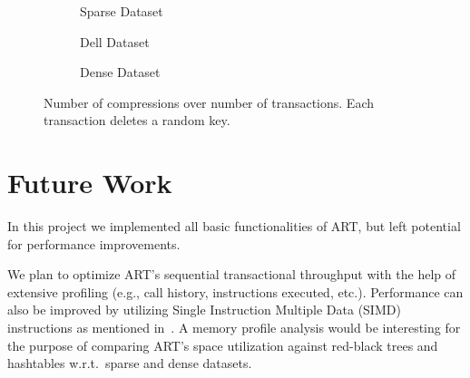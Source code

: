 \documentclass[abstracton,12pt]{scrartcl}
\theoremstyle{definition}
\begin{document}
\begin{figure}[H]
  \centering
  \begin{subfigure}[b]{0.30\textwidth}
    \caption{Sparse Dataset}
    \label{fig:compressions-sparse}
  \end{subfigure}
  \begin{subfigure}[b]{0.30\textwidth}
    \caption{Dell Dataset}
    \label{fig:compressions-paths}
  \end{subfigure}
  \begin{subfigure}[b]{0.30\textwidth}
    \caption{Dense Dataset}
    \label{fig:compressions-dense}
  \end{subfigure}
  \caption{Number of compressions over number of transactions. Each transaction
  deletes a random key.}
\end{figure}

\vspace{-5mm}
\section{Future Work}
\label{sec:future-work}

In this project we implemented all basic functionalities of ART, but left 
potential for performance improvements.

We plan to optimize ART's sequential transactional throughput with the help of
extensive profiling (e.g., call history, instructions executed, etc.).
Performance can also be improved by utilizing Single Instruction
Multiple Data (SIMD) instructions as mentioned in~\cite{leis2013adaptive}.
A memory profile analysis would be interesting for the purpose of comparing
ART's space utilization against red-black trees and hashtables w.r.t.\ sparse
and dense datasets.
\end{document}

